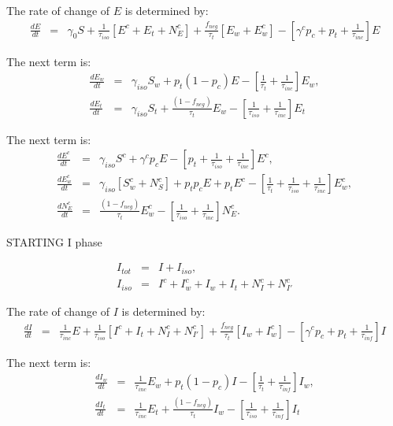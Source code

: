 \documentclass[notitlepage, superscriptaddress]{revtex4-2}
\begin{document}
The rate of change of $E$ is determined by:
\begin{eqnarray}
\label{E:dE}
\frac{dE}{dt} &=& \gamma_{0}S  + \frac{1}{\tau_{iso}}[E^{c} + E_{t} + N^{c}_{E}] + \frac{f_{neg}}{\tau_{t}}[E_{w} + E^{c}_{w}] -  [\gamma^{c} p_{c} +p_{t} + \frac{1}{\tau_{inc}}] E
\end{eqnarray}

The next term is:
\begin{eqnarray}
\label{E:dE_w}
\frac{dE_{w}}{dt} &=& \gamma_{iso} S_{w} + p_{t} (1 - p_{c}) E - [\frac{1}{\tau_{t}}  + \frac{1}{\tau_{inc}}] E_{w}, \\
\frac{dE_{t}}{dt} &=& \gamma_{iso} S_{t} + \frac{(1- f_{neg})}{\tau_{t}} E_{w} - [\frac{1}{\tau_{iso}}  + \frac{1}{\tau_{inc}}] E_{t}\end{eqnarray}

The next term is:
\begin{eqnarray}
\label{E:dEc}
 \frac{dE^{c}}{dt} &=& \gamma_{iso} S^{c} + \gamma^{c} p_{c} E -[p_{t} +\frac{1}{\tau_{iso}} + \frac{1}{\tau_{inc}}] E^{c}, \\
 \frac{dE^{c}_{w}}{dt} &=& \gamma_{iso} [S^{c}_{w} + N^{c}_{S}]+ p_{t}p_{c} E + p_{t}E^{c} - [\frac{1}{\tau_{t}}  + \frac{1}{\tau_{iso}}  + \frac{1}{\tau_{inc}}] E^{c}_{w}, \\ 
 \frac{dN^{c}_{E}}{dt} &=&  \frac{(1-f_{neg})}{\tau_{t}} E^{c}_{w} - [\frac{1}{\tau_{iso}}  + \frac{1}{\tau_{inc}}] N^{c}_{E}.  
\end{eqnarray}

STARTING I phase

\begin{eqnarray}
\label{E:Itot}
I_{tot} &=& I + I_{iso}, \\ 
I_{iso} &=& I^{c} + I^{c}_{w} + I_{w} + I_{t} + N^{c}_{I} + N^{c}_{I'}
\end{eqnarray}

The rate of change of $I$ is determined by:
\begin{eqnarray}
\label{E:dI}
\frac{dI}{dt} &=& \frac{1}{\tau_{inc}}E  + \frac{1}{\tau_{iso}}[I^{c} + I_{t} + N^{c}_{I} + N^{c}_{I'}] + \frac{f_{neg}}{\tau_{t}}[I_{w} + I^{c}_{w}] -  [\gamma^{c} p_{c} +p_{t} + \frac{1}{\tau_{inf}}] I
\end{eqnarray}


The next term is:
\begin{eqnarray}
\label{E:dI_w}
\frac{dI_{w}}{dt} &=& \frac{1}{\tau_{inc}} E_{w} + p_{t} (1 - p_{c}) I - [\frac{1}{\tau_{t}}  + \frac{1}{\tau_{inf}}] I_{w}, \\
\frac{dI_{t}}{dt} &=& \frac{1}{\tau_{inc}} E_{t} + \frac{(1- f_{neg})}{\tau_{t}} I_{w} - [\frac{1}{\tau_{iso}}  + \frac{1}{\tau_{inf}}] I_{t}\end{eqnarray}
\end{document}
